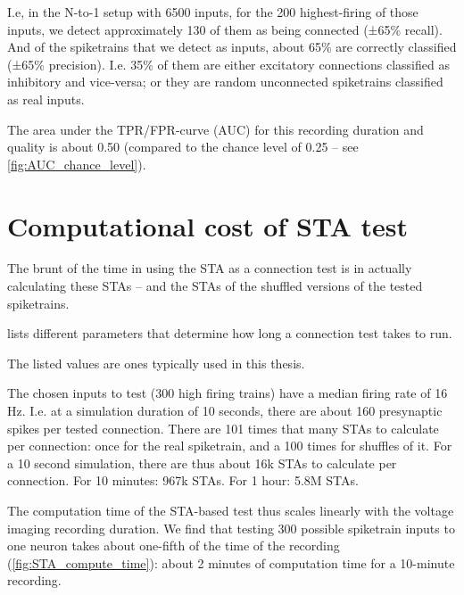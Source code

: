 I.e, in the N-to-1 setup with 6500 inputs, for the 200 highest-firing of those inputs, we detect approximately 130 of them as being connected (±65\% recall). And of the spiketrains that we detect as inputs, about 65\% are correctly classified  (±65\% precision). I.e. 35\% of them are either excitatory connections classified as inhibitory and vice-versa; or they are random unconnected spiketrains classified as real inputs.

The area under the TPR/FPR-curve (AUC) for this recording duration and quality is about 0.50 (compared to the chance level of 0.25 -- see \cref{fig:AUC_chance_level}).


\section{Computational cost of STA test}

The brunt of the time in using the STA as a connection test is in actually calculating these STAs -- and the STAs of the shuffled versions of the tested spiketrains.

 lists different parameters that determine how long a connection test takes to run.

\begin{table}
    
    {The listed values are ones typically used in this thesis.}
    \label{tab:conntest-time-factors}
\end{table}


The chosen inputs to test (300 high firing trains) have a median firing rate of 16 Hz. I.e. at a simulation duration of 10 seconds, there are about 160 presynaptic spikes per tested connection. There are 101 times that many STAs to calculate per connection: once for the real spiketrain, and a 100 times for shuffles of it. For a 10 second simulation, there are thus about 16k STAs to calculate per connection.
For 10 minutes: 967k STAs. For 1 hour: 5.8M STAs.

The computation time of the STA-based test thus scales linearly with the voltage imaging recording duration. We find that testing 300 possible spiketrain inputs to one neuron takes about one-fifth of the time of the recording (\cref{fig:STA_compute_time}): about 2 minutes of computation time for a 10-minute recording.

